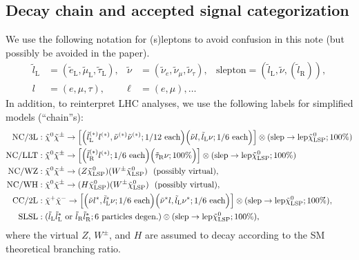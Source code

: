 \documentclass[a4paper,10pt,captions=tableheading,DIV=14]{scrartcl}
\numberwithin{equation}{section}
\newcommand\w[1]{_{\mathrm{#1}}}
\newcommand\lL{\tilde l\w L}
\newcommand\lR{\tilde l\w R}
\newcommand\neut  [1][\relax]{{\tilde\chi^0_{#1}}}
\newcommand\charP [1][\relax]{{\tilde\chi^+_{#1}}}
\newcommand\charM [1][\relax]{{\tilde\chi^-_{#1}}}
\newcommand\charPM[1][\relax]{{\tilde\chi^\pm_{#1}}}
\begin{document}
\subsection{Decay chain and accepted signal categorization}
We use the following notation for (s)leptons to avoid confusion in this note (but possibly be avoided in the paper).
\begin{align*}
\lL &= (\tilde e\w L, \tilde \mu\w L, \tilde\tau\w L),
&
\tilde\nu &= (\tilde \nu_e, \tilde\nu_\mu, \tilde\nu_\tau),
&
\text{slepton}=(\lL,\tilde\nu, (\lR)),
\\
l&=(e,\mu,\tau),
&
\ell&=(e,\mu),\dots
\end{align*}
In addition, to reinterpret LHC analyses, we use the following labels for simplified models (``chain''s):
\begin{align}
 \text{NC/3L}&: \neut\charPM\to
\left[
\Bigl(\lL^{(*)}l^{(*)},\tilde\nu^{(*)}\tilde\nu^{(*)};\text{1/12 each}\Bigr)
\Bigl(\tilde\nu l,\lL\nu;\text{1/6 each}\Bigr)
\right]
 \otimes(\text{slep}\to \text{lep}\neut[\text{LSP}]; \text{100\%})\\
 \text{NC/LLT}&: \neut\charPM\to
\left[
\Bigl(\lR^{(*)}l^{(*)};\text{1/6 each}\Bigr)
\Bigl(\tilde \tau\w R\nu;\text{100\%}\Bigr)
\right]
 \otimes(\text{slep}\to \text{lep}\neut[\text{LSP}]; \text{100\%})\\
 \text{NC/WZ}&: \neut\charPM\to(Z\neut[\text{LSP}])(W^\pm\neut[\text{LSP}])~~\text{(possibly virtual)},\\
 \text{NC/WH}&: \neut\charPM\to(H\neut[\text{LSP}])(W^\pm\neut[\text{LSP}])~~\text{(possibly virtual)},\\
 \text{CC/2L}&: \charP\charM\to
\left[
\Bigl(\tilde\nu l^*,\lL^*\nu;\text{1/6 each}\Bigr)
\Bigl(\tilde\nu^* l,\lL\nu^*;\text{1/6 each}\Bigr)
\right]
 \otimes(\text{slep}\to \text{lep}\neut[\text{LSP}]; \text{100\%}),\\
 \text{SLSL}&: (\lL\lL^*\text{ or }\lR\lR^*;\text{6 particles degen.})
 \otimes(\text{slep}\to \text{lep}\neut[\text{LSP}]; \text{100\%}),
\end{align}
where the virtual $Z$, $W^\pm$, and $H$ are assumed to decay according to the SM theoretical branching ratio.
\end{document}
